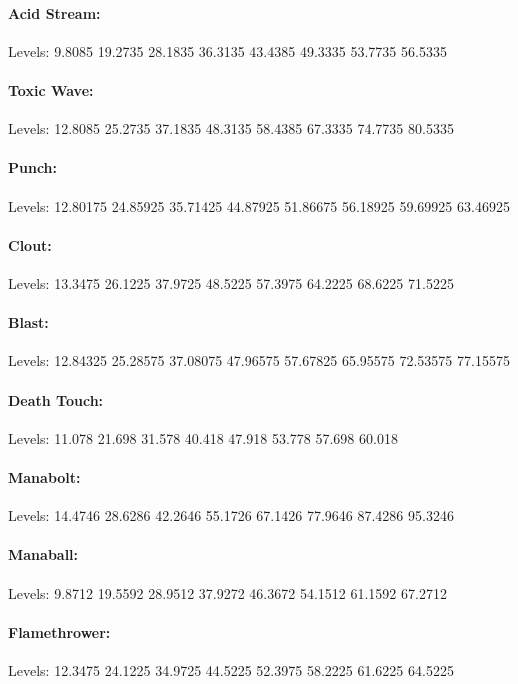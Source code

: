 \begin{multicols*}{2}
	\paragraph{Acid Stream:} Levels: 9.8085 19.2735 28.1835 36.3135 43.4385 49.3335 53.7735 56.5335
	
	\paragraph{Toxic Wave:} Levels: 12.8085 25.2735 37.1835 48.3135 58.4385 67.3335 74.7735 80.5335
	
	\paragraph{Punch:} Levels: 12.80175 24.85925 35.71425 44.87925 51.86675 56.18925 59.69925 63.46925
	
	\paragraph{Clout:} Levels: 13.3475 26.1225 37.9725 48.5225 57.3975 64.2225 68.6225 71.5225
	
	\paragraph{Blast:} 	Levels: 12.84325 25.28575 37.08075 47.96575 57.67825 65.95575 72.53575 77.15575
	
	\paragraph{Death Touch:} Levels: 11.078 21.698 31.578 40.418 47.918 53.778 57.698 60.018
	
	\paragraph{Manabolt:} Levels: 14.4746 28.6286 42.2646 55.1726 67.1426 77.9646 87.4286 95.3246
	
	\paragraph{Manaball:}Levels: 9.8712 19.5592 28.9512 37.9272 46.3672 54.1512 61.1592 67.2712
	
	\paragraph{Flamethrower:} Levels: 12.3475 24.1225 34.9725 44.5225 52.3975 58.2225 61.6225 64.5225
	

\end{multicols*}
